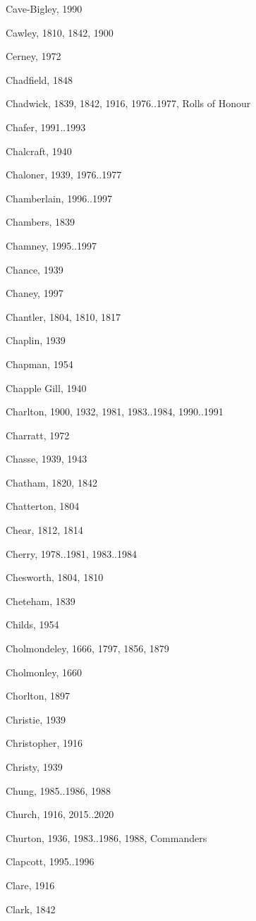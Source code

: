 \begin{theindex}
\item Cave-Bigley, 1990
\item Cawley, 1810, 1842, 1900
\item Cerney, 1972
\item Chadfield, 1848
\item Chadwick, 1839, 1842, 1916, 1976..1977, Rolls of Honour
\item Chafer, 1991..1993
\item Chalcraft, 1940
\item Chaloner, 1939, 1976..1977
\item Chamberlain, 1996..1997
\item Chambers, 1839
\item Chamney, 1995..1997
\item Chance, 1939
\item Chaney, 1997
\item Chantler, 1804, 1810, 1817
\item Chaplin, 1939
\item Chapman, 1954
\item Chapple Gill, 1940
\item Charlton, 1900, 1932, 1981, 1983..1984, 1990..1991
\item Charratt, 1972
\item Chasse, 1939, 1943
\item Chatham, 1820, 1842
\item Chatterton, 1804
\item Chear, 1812, 1814
\item Cherry, 1978..1981, 1983..1984
\item Chesworth, 1804, 1810
\item Cheteham, 1839
\item Childs, 1954
\item Cholmondeley, 1666, 1797, 1856, 1879
\item Cholmonley, 1660
\item Chorlton, 1897
\item Christie, 1939
\item Christopher, 1916
\item Christy, 1939
\item Chung, 1985..1986, 1988
\item Church, 1916, 2015..2020
\item Churton, 1936, 1983..1986, 1988, Commanders
\item Clapcott, 1995..1996
\item Clare, 1916
\item Clark, 1842

\end{theindex}
